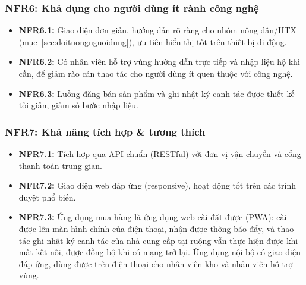 \subsubsection*{NFR6: Khả dụng cho người dùng ít rành công nghệ}
\begin{itemize}
    \item \textbf{NFR6.1:} Giao diện đơn giản, hướng dẫn rõ ràng cho nhóm
    nông dân/HTX (mục~\ref{sec:doituongnguoidung}), ưu tiên hiển thị tốt
    trên thiết bị di động.
    \item \textbf{NFR6.2:} Có nhân viên hỗ trợ vùng hướng dẫn trực tiếp và nhập
    liệu hộ khi cần, để giảm rào cản thao tác cho người dùng ít quen thuộc với
    công nghệ.
    \item \textbf{NFR6.3:} Luồng đăng bán sản phẩm và ghi nhật ký canh tác
    được thiết kế tối giản, giảm số bước nhập liệu.
\end{itemize}

\subsubsection*{NFR7: Khả năng tích hợp \& tương thích}
\begin{itemize}
    \item \textbf{NFR7.1:} Tích hợp qua API chuẩn (RESTful) với đơn vị vận
    chuyển và cổng thanh toán trung gian.
    \item \textbf{NFR7.2:} Giao diện web đáp ứng (responsive), hoạt động
    tốt trên các trình duyệt phổ biến.
    \item \textbf{NFR7.3:} Ứng dụng mua hàng là ứng dụng web cài đặt được
    (PWA): cài được lên màn hình chính của điện thoại, nhận được thông báo
    đẩy, và thao tác ghi nhật ký canh tác của nhà cung cấp tại ruộng vẫn thực
    hiện được khi mất kết nối, được đồng bộ khi có mạng trở lại. Ứng dụng nội
    bộ có giao diện đáp ứng, dùng được trên điện thoại cho nhân viên kho và
    nhân viên hỗ trợ vùng.
\end{itemize}

